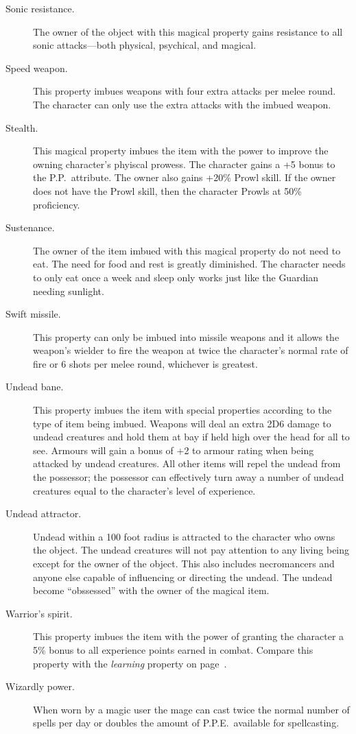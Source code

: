 \begin{description}
\item[Sonic resistance.]
The owner of the object with this magical
property gains resistance to all sonic
attacks---both physical, psychical, and
magical.

\item[Speed weapon.] This property imbues
weapons with four extra attacks per melee round.
The character can only
use the extra attacks with the imbued weapon.

\item[Stealth.] This magical property
imbues the item with the power to
improve the owning character's
phyiscal prowess.
The character gains a
+5 bonus to the P.P.\ attribute.
The owner also gains +20\% Prowl
skill.
If the owner does not have the Prowl
skill, then the character Prowls at
50\% proficiency.

\item[Sustenance.]
The owner of the item imbued with this
magical property do not need to eat.
The need for food and rest is greatly
diminished. The character needs to
only eat once a week and sleep only
works just like the Guardian needing
sunlight.

\item[Swift missile.]
This property can only be imbued into missile weapons
and it allows the weapon's wielder to fire the weapon
at twice the character's
normal rate of fire or 6 shots per melee
round, whichever is greatest.

\item[Undead bane.] This property imbues the item with special properties according
to the type of item being imbued.
Weapons will deal an extra 2D6 damage to undead creatures and hold them at bay if
held high over the head for all to see.
Armours will gain a bonus of +2 to armour rating when being attacked by undead
creatures.
All other items will repel the undead from the possessor;
the possessor can effectively turn away a number of undead creatures equal to
the character's level of experience.

\item[Undead attractor.]
Undead within a 100 foot radius is attracted
to the character who owns the object.
The undead creatures will not pay attention
to any living being except for the owner of
the object.
This also includes necromancers and anyone
else capable of influencing or directing the
undead.
The undead become ``obssessed'' with
the owner of the magical item.

\item[Warrior's spirit.]\label{mp:warriorspirit}
This property imbues the item with the power of granting the character a 5\% bonus
to all experience points earned in combat.
Compare this property with the \emph{learning} property on page~\pageref{mp:learning}.

\item[Wizardly power.]\label{mp:wizardly}
When worn by a magic user the mage can cast twice the normal number
of spells per day or doubles the amount of P.P.E.\ available for
spellcasting.
\end{description}

